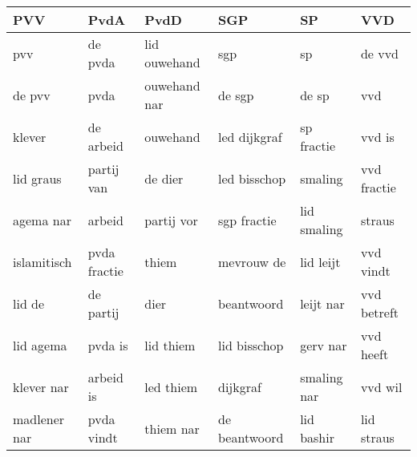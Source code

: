 \begin{tabular}{llllll}
\toprule
          PVV &          PvdA &          PvdD &            SGP &           SP &          VVD \\
\midrule
          pvv &       de pvda &  lid ouwehand &            sgp &           sp &       de vvd \\
       de pvv &          pvda &  ouwehand nar &         de sgp &        de sp &          vvd \\
       klever &     de arbeid &      ouwehand &   led dijkgraf &   sp fractie &       vvd is \\
    lid graus &    partij van &       de dier &   led bisschop &      smaling &  vvd fractie \\
    agema nar &        arbeid &    partij vor &    sgp fractie &  lid smaling &       straus \\
  islamitisch &  pvda fractie &         thiem &     mevrouw de &    lid leijt &    vvd vindt \\
       lid de &     de partij &          dier &     beantwoord &    leijt nar &  vvd betreft \\
    lid agema &       pvda is &     lid thiem &   lid bisschop &     gerv nar &    vvd heeft \\
   klever nar &     arbeid is &     led thiem &       dijkgraf &  smaling nar &      vvd wil \\
 madlener nar &    pvda vindt &     thiem nar &  de beantwoord &   lid bashir &   lid straus \\
\bottomrule
\end{tabular}
